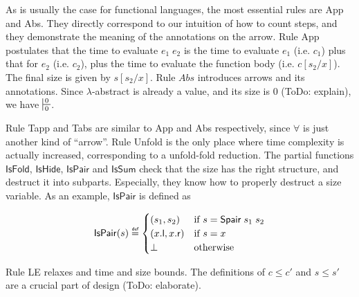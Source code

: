 \documentclass[preprint]{sigplanconf}
\newcommand{\syml}{\mathsf{l}}
\newcommand{\symr}{\mathsf{r}}
\newcommand{\symSpair}{\mathsf{Spair}}
\newcommand\defeq{\mathrel{\overset{\makebox[0pt]{\mbox{\normalfont\tiny\sffamily def}}}{=}}}
\begin{document}
As is usually the case for functional languages, the most essential rules are {\sc App} and {\sc Abs}. They directly correspond to our intuition of how to count steps, and they demonstrate the meaning of the annotations on the arrow. Rule {\sc App} postulates that the time to evaluate $e_1\;e_2$ is the time to evaluate $e_1$ (i.e. $c_1$) plus that for $e_2$ (i.e. $c_2$), plus the time to evaluate the function body (i.e. $c[s_2/x]$). The final size is given by $s[s_2/x]$. Rule $Abs$ introduces arrows and its annotations. Since $\lambda$-abstract is already a value, and its size is 0 (ToDo: explain), we have $\turnstile{s}{s}{0}{0}{n}$.

Rule {\sc Tapp} and {\sc Tabs} are similar to {\sc App} and {\sc Abs} respectively, since $\forall$ is just another kind of ``arrow''. Rule {\sc Unfold} is the only place where time complexity is actually increased, corresponding to a unfold-fold reduction. The partial functions $\mathsf{IsFold}$, $\mathsf{IsHide}$, $\mathsf{IsPair}$ and $\mathsf{IsSum}$ check that the size has the right structure, and destruct it into subparts. Especially, they know how to properly destruct a size variable. As an example, $\mathsf{IsPair}$ is defined as

$$
\mathsf{IsPair}(s)\defeq\begin{cases}
(s_1, s_2) & \mbox{if } s = \symSpair\;s_1\;s_2 \\
(x.\syml, x.\symr) & \mbox{if } s = x \\
\bot & \mbox{otherwise}\\
\end{cases}
$$

Rule {\sc LE} relaxes and time and size bounds. The definitions of $c\leq c'$ and $s\leq s'$ are a crucial part of design (ToDo: elaborate).
\end{document}
